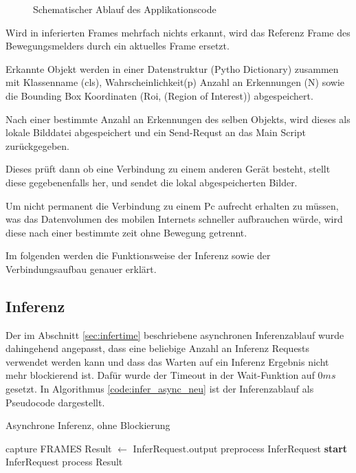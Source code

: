 \vspace{1cm}
\begin{figure}[H]
    \centering
        
    \caption{Schematischer Ablauf des Applikationscode}
    \label{fig:flowchart_appl}
\end{figure}
\vspace{1cm}


Wird in inferierten Frames mehrfach nichts 
erkannt, wird das Referenz Frame des 
Bewegungsmelders durch ein aktuelles Frame ersetzt.

Erkannte Objekt werden in einer
Datenstruktur (Pytho Dictionary) zusammen 
mit Klassenname (cls), Wahrscheinlichkeit(p)
Anzahl an Erkennungen (N) sowie die Bounding 
Box Koordinaten (Roi, (Region of Interest)) 
abgespeichert.

Nach einer bestimmte Anzahl 
an Erkennungen des selben Objekts, wird dieses 
als lokale Bilddatei abgespeichert und ein 
Send-Requst an das Main Script zurückgegeben.

Dieses prüft dann ob eine Verbindung zu einem 
anderen Gerät besteht, stellt diese gegebenenfalls her,
und sendet die lokal abgespeicherten Bilder.

Um nicht permanent die Verbindung zu einem Pc aufrecht erhalten 
zu müssen, was das Datenvolumen des mobilen Internets
schneller aufbrauchen würde, wird diese nach einer 
bestimmte zeit ohne Bewegung getrennt.

Im folgenden werden die Funktionsweise der 
Inferenz sowie der Verbindungsaufbau 
genauer erklärt.


\subsection*{Inferenz}

Der im Abschnitt \ref{sec:infertime} beschriebene asynchronen
Inferenzablauf wurde dahingehend angepasst, dass eine beliebige
Anzahl an Inferenz Requests verwendet werden kann 
und dass das Warten auf ein Inferenz Ergebnis
nicht mehr blockierend ist.
Dafür wurde der Timeout in der Wait-Funktion auf 
$0ms$ gesetzt.
In Algorithmus \ref{code:infer_async_neu} ist 
der Inferenzablauf als Pseudocode dargestellt.

\begin{algorithm}[H]
    \caption{Asynchrone Inferenz, ohne Blockierung}
    \label{code:infer_async_neu}
    \begin{algorithmic}
    \WHILE{\TRUE}
    \STATE capture FRAMES
                \STATE Result $\leftarrow$ InferRequest.output
            \ENDIF
                \STATE preprocess InferRequest
                \STATE \textbf{start} InferRequest
            \ENDIF
                \STATE process Result
            \ENDIF
        \ENDFOR
    \ENDWHILE
    \end{algorithmic}
\end{algorithm}    





